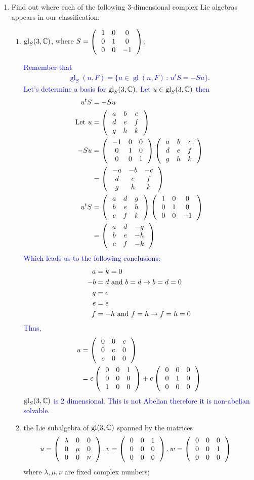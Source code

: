 \documentclass[12pt,a4paper]{report}
\newcommand{\BLUE}[1]{\textcolor{blue}{#1}}
\newcommand{\GL}{\operatorname{gl}}
\begin{document}
\begin{enumerate}[label=3.\arabic*.]
\item Find out where each of the following 3-dimensional complex Lie algebras appears in our classification:
\begin{enumerate}[label=(\roman*)]

	\item $\GL_S(3,\C)$, where $S=\left (\,  \begin{array}{c c c} 1&0&0 \\ 0 & 1 & 0 \\ 0 & 0 & -1 \end{array}  \,\right )$;
	
	\BLUE{Remember that 
	\begin{align*}
	\GL_S(n,F) = \{u \in \GL(n,F)\,:\, u^tS=-Su\}.
	\end{align*}Let's determine a basis for $\GL_S(3,\C)$.  Let $u \in \GL_S(3,\C)$  then 
	\begin{align*}
		u^tS &= -Su \\
		\text{Let } u &= \left (\,  \begin{array}{c c c} a&b&c \\ d & e & f \\ g & h & k \end{array}  \,\right ) \\
		-Su &= \left (\,  \begin{array}{c c c} -1&0&0 \\ 0 & 1 & 0 \\ 0 & 0 & 1 \end{array}  \,\right )\left (\,  \begin{array}{c c c} a&b&c \\ d & e & f \\ g & h & k \end{array}  \,\right ) \\
		&= \left (\,  \begin{array}{c c c} -a&-b&-c \\ d & e & f \\ g & h & k \end{array}  \,\right ) \\
		u^tS &= \left (\,  \begin{array}{c c c} a&d&g \\ b & e & h \\ c & f & k \end{array}  \,\right )\left (\,  \begin{array}{c c c} 1&0&0 \\ 0 & 1 & 0 \\ 0 & 0 & -1 \end{array}  \,\right ) \\
		&= \left (\,  \begin{array}{c c c} a&d&-g \\ b & e & -h \\ c & f & -k \end{array}  \,\right )
	\end{align*}Which leads us to the following conclusions:
	\begin{align*}
		a &= k = 0\\
		-b &= d \text{ and } b=d \to b=d=0 \\
		g &= c \\
		e &= e \\
		f &= -h \text{ and } f=h \to f=h=0
	\end{align*}Thus, 
	\begin{align*}
		u &= \left (\,  \begin{array}{c c c} 0&0&c \\ 0 & e & 0 \\ c & 0 & 0 \end{array}  \,\right ) \\
		&= c\left (\,  \begin{array}{c c c} 0&0&1 \\ 0 & 0 & 0 \\ 1 & 0 & 0 \end{array}  \,\right )+e\left (\,  \begin{array}{c c c} 0&0&0 \\ 0 & 1 & 0 \\ 0 & 0 & 0 \end{array}  \,\right )
	\end{align*}$\GL_S(3,\C)$ is 2 dimensional. This is not Abelian therefore it is non-abelian solvable.
	}
	
	\item the Lie subalgebra of $\GL(3,\C)$ spanned by the matrices
	\begin{align*}
		u &= \left (\,  \begin{array}{c c c} \lambda&0&0 \\ 0 & \mu & 0 \\ 0 & 0 & \nu \end{array}  \,\right ), v= \left (\,  \begin{array}{c c c} 0&0&1 \\ 0 & 0 & 0 \\ 0 & 0 & 0 \end{array}  \,\right ), w=\left (\,  \begin{array}{c c c} 0&0&0 \\ 0 & 0 & 1 \\ 0 & 0 & 0 \end{array}  \,\right )
	\end{align*}where $\lambda, \mu, \nu$ are fixed complex numbers;
	

\end{enumerate}
\end{enumerate}
\end{document}
